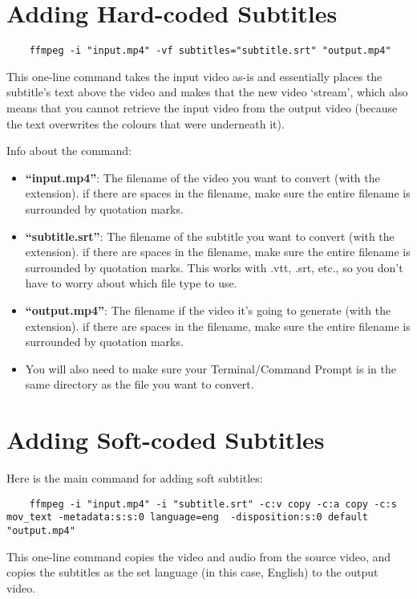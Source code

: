 \documentclass{article}
\begin{document}
\section{Adding Hard-coded Subtitles}

\begin{lstlisting}
    ffmpeg -i "input.mp4" -vf subtitles="subtitle.srt" "output.mp4"
\end{lstlisting}

This one-line command takes the input video as-is and essentially places the subtitle's text above the video and makes that the new video `stream', which also means that you cannot retrieve the input video from the output video (because the text overwrites the colours that were underneath it).

Info about the command:
\begin{itemize}
    \item \textbf{``input.mp4''}: The filename of the video you want to convert (with the extension). if there are spaces in the filename, make sure the entire filename is surrounded by quotation marks.  
    \item \textbf{``subtitle.srt''}: The filename of the subtitle you want to convert (with the extension). if there are spaces in the filename, make sure the entire filename is surrounded by quotation marks. This works with .vtt, .srt, etc., so you don't have to worry about which file type to use.
    \item \textbf{``output.mp4''}: The filename if the video it's going to generate (with the extension). if there are spaces in the filename, make sure the entire filename is surrounded by quotation marks. 
    \item You will also need to make sure your Terminal/Command Prompt is in the same directory as the file you want to convert.
\end{itemize}

\section{Adding Soft-coded Subtitles}
Here is the main command for adding soft subtitles:

\begin{lstlisting}
    ffmpeg -i "input.mp4" -i "subtitle.srt" -c:v copy -c:a copy -c:s mov_text -metadata:s:s:0 language=eng  -disposition:s:0 default "output.mp4"
\end{lstlisting}

This one-line command copies the video and audio from the source video, and copies the subtitles as the set language (in this case, English) to the output video. 
\end{document}
